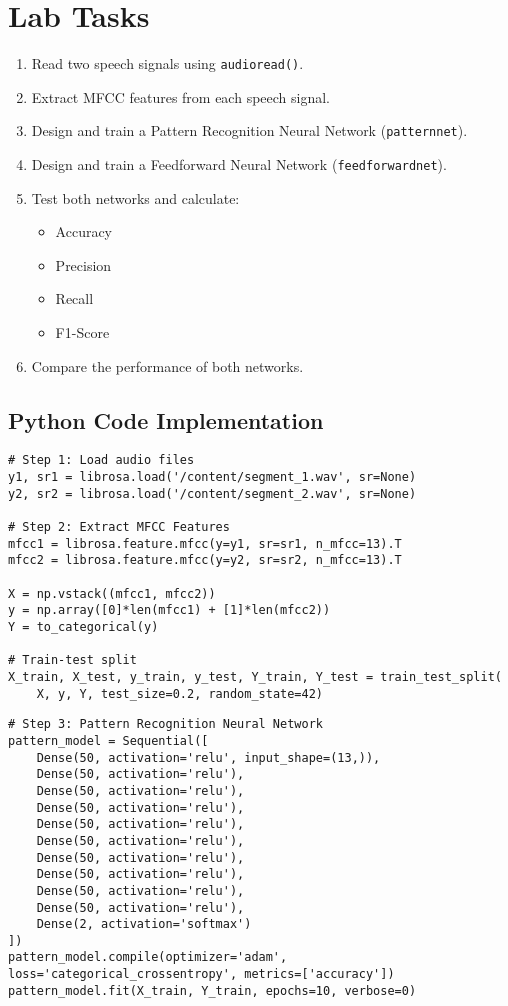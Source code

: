 \documentclass[a4paper,12pt]{article}
\begin{document}
\section{Lab Tasks}
\begin{enumerate}
    \item Read two speech signals using \texttt{audioread()}.
    \item Extract MFCC features from each speech signal.
    \item Design and train a Pattern Recognition Neural Network (\texttt{patternnet}).
    \item Design and train a Feedforward Neural Network (\texttt{feedforwardnet}).
    \item Test both networks and calculate:
    \begin{itemize}
        \item Accuracy
        \item Precision
        \item Recall
        \item F1-Score
    \end{itemize}
    \item Compare the performance of both networks.
\end{enumerate}

\subsection{Python Code Implementation}

\begin{verbatim}
# Step 1: Load audio files
y1, sr1 = librosa.load('/content/segment_1.wav', sr=None)
y2, sr2 = librosa.load('/content/segment_2.wav', sr=None)

# Step 2: Extract MFCC Features
mfcc1 = librosa.feature.mfcc(y=y1, sr=sr1, n_mfcc=13).T
mfcc2 = librosa.feature.mfcc(y=y2, sr=sr2, n_mfcc=13).T

X = np.vstack((mfcc1, mfcc2))
y = np.array([0]*len(mfcc1) + [1]*len(mfcc2))
Y = to_categorical(y)

# Train-test split
X_train, X_test, y_train, y_test, Y_train, Y_test = train_test_split(
    X, y, Y, test_size=0.2, random_state=42)
\end{verbatim}

\begin{verbatim}
# Step 3: Pattern Recognition Neural Network
pattern_model = Sequential([
    Dense(50, activation='relu', input_shape=(13,)),
    Dense(50, activation='relu'),
    Dense(50, activation='relu'),
    Dense(50, activation='relu'),
    Dense(50, activation='relu'),
    Dense(50, activation='relu'),
    Dense(50, activation='relu'),
    Dense(50, activation='relu'),
    Dense(50, activation='relu'),
    Dense(50, activation='relu'),
    Dense(2, activation='softmax')
])
pattern_model.compile(optimizer='adam', loss='categorical_crossentropy', metrics=['accuracy'])
pattern_model.fit(X_train, Y_train, epochs=10, verbose=0)
\end{verbatim}
\end{document}
